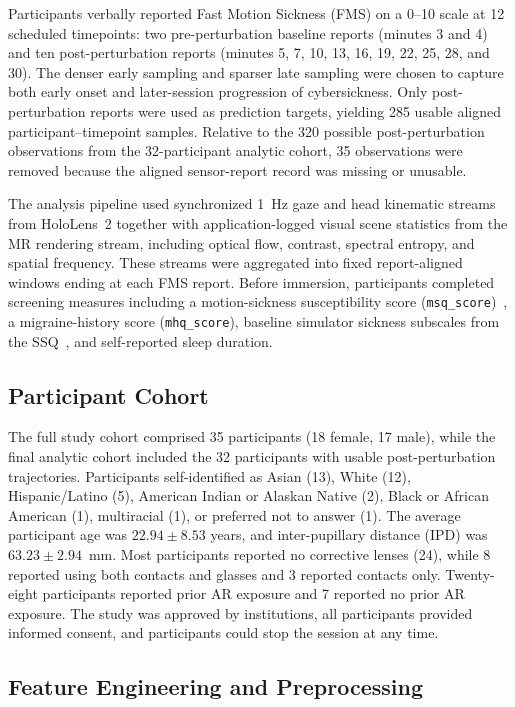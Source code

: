 \documentclass[review]{vgtc}              %
\begin{document}
Participants verbally reported Fast Motion Sickness (FMS) on a 0--10 scale at 12 scheduled timepoints: two pre-perturbation baseline reports (minutes 3 and 4) and ten post-perturbation reports (minutes 5, 7, 10, 13, 16, 19, 22, 25, 28, and 30). The denser early sampling and sparser late sampling were chosen to capture both early onset and later-session progression of cybersickness. Only post-perturbation reports were used as prediction targets, yielding 285 usable aligned participant--timepoint samples. Relative to the 320 possible post-perturbation observations from the 32-participant analytic cohort, 35 observations were removed because the aligned sensor-report record was missing or unusable.

The analysis pipeline used synchronized 1~Hz gaze and head kinematic streams from HoloLens~2 together with application-logged visual scene statistics from the MR rendering stream, including optical flow, contrast, spectral entropy, and spatial frequency. These streams were aggregated into fixed report-aligned windows ending at each FMS report. Before immersion, participants completed screening measures including a motion-sickness susceptibility score (\texttt{msq\_score})~\cite{Reason1975MotionSickness, Golding1998MSSQ}, a migraine-history score (\texttt{mhq\_score}), baseline simulator sickness subscales from the SSQ~\cite{Kennedy1993SSQ}, and self-reported sleep duration.

\subsection{Participant Cohort}

The full study cohort comprised 35 participants (18 female, 17 male), while the final analytic cohort included the 32 participants with usable post-perturbation trajectories. Participants self-identified as Asian (13), White (12), Hispanic/Latino (5), American Indian or Alaskan Native (2), Black or African American (1), multiracial (1), or preferred not to answer (1). The average participant age was $22.94 \pm 8.53$ years, and inter-pupillary distance (IPD) was $63.23 \pm 2.94$~mm. Most participants reported no corrective lenses (24), while 8 reported using both contacts and glasses and 3 reported contacts only. Twenty-eight participants reported prior AR exposure and 7 reported no prior AR exposure. The study was approved by institutions, all participants provided informed consent, and participants could stop the session at any time.

\subsection{Feature Engineering and Preprocessing}\label{sec:features}
\end{document}
